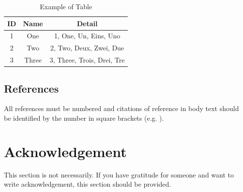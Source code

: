\documentclass[ams]{U-AizuGT}
\begin{document}
			\begin{table}[htb]
				\caption{Example of Table}
				\label{tb:table}
				\begin{tabular}{|c|c|c|} \hline
					ID & Name & Detail \\ \hline \hline
					1 & One & 1, One, Un, Eins, Uno \\ \hline
					2 & Two & 2, Two, Deux, Zwei, Due \\ \hline
					3 & Three & 3, Three, Trois, Drei, Tre \\ \hline
				\end{tabular}
			\end{table}
			
		\subsection{References}
			All references must be numbered and citations of reference in body text should be identified by the number in square brackets (e.g. \cite{graduation-thesis} \cite{fukushima-thesis} \cite{nara-nice}).

	\section*{Acknowledgement}
		This section is not necessarily. If you have gratitude for someone and want to write acknowledgement, this section should be provided.
		
	
\end{document}

